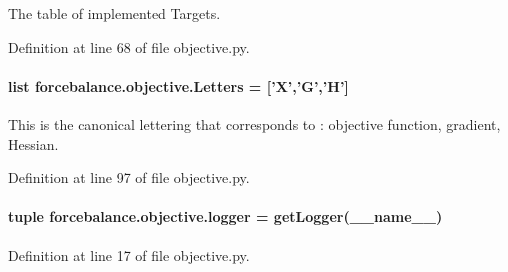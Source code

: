 The table of implemented Targets. 



Definition at line 68 of file objective.\-py.

\hypertarget{namespaceforcebalance_1_1objective_a89a971322532b36852765b2680651f1f}{
\paragraph[{Letters}]{\setlength{\rightskip}{0pt plus 5cm}list forcebalance.\-objective.\-Letters = \mbox{[}'X','G','H'\mbox{]}}}\label{namespaceforcebalance_1_1objective_a89a971322532b36852765b2680651f1f}


This is the canonical lettering that corresponds to \-: objective function, gradient, Hessian. 



Definition at line 97 of file objective.\-py.

\hypertarget{namespaceforcebalance_1_1objective_ac2e1e8c9612652836168e5cdde77b6e7}{
\paragraph[{logger}]{\setlength{\rightskip}{0pt plus 5cm}tuple forcebalance.\-objective.\-logger = get\-Logger(\-\_\-\-\_\-name\-\_\-\-\_\-)}}\label{namespaceforcebalance_1_1objective_ac2e1e8c9612652836168e5cdde77b6e7}


Definition at line 17 of file objective.\-py.

